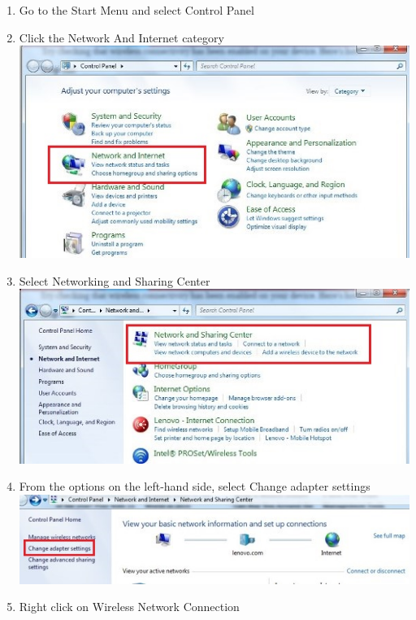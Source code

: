 \documentclass[
]{book}
\providecommand{\tightlist}{%
  \setlength{\itemsep}{0pt}\setlength{\parskip}{0pt}}
\begin{document}
\begin{enumerate}
\def\labelenumi{\arabic{enumi}.}
\tightlist
\item
  Go to the Start Menu and select Control Panel
\item
  Click the Network And Internet category\\
  \includegraphics{images/scan_protocol/1.jpg}
\item
  Select Networking and Sharing Center\\
  \includegraphics{images/scan_protocol/2.jpg}
\item
  From the options on the left-hand side, select Change adapter settings\\
  \includegraphics{images/scan_protocol/3.jpg}
\item
  Right click on Wireless Network Connection\\

\end{enumerate}
\end{document}
